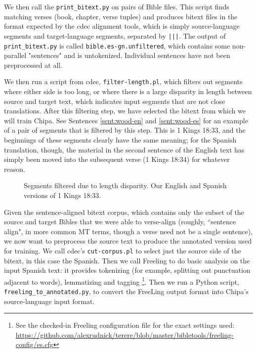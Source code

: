 We then call the \texttt{print\_bitext.py} on pairs of Bible files. This script
finds matching verses (book, chapter, verse tuples) and produces bitext files
in the format expected by the cdec alignment tools, which is simply
source-language segments and target-language segments, separated by
\texttt{|||}. The output of \texttt{print\_bitext.py} is called
\texttt{bible.es-gn.unfiltered}, which contains some non-parallel "sentences"
and is untokenized. Individual sentences have not been preprocessed at all.

We then run a script from cdec, \texttt{filter-length.pl}, which filters
out segments where either side is too long, or where there is a large disparity
in length between source and target text, which indicates input segments that
are not close translations. After this filtering step, we have selected the
bitext from which we will train Chipa. See Sentences \ref{sent:wood-en} and
\ref{sent:wood-es} for an example of a pair of segments that is filtered by
this step. This is 1 Kings 18:33, and the beginnings of these segments clearly
have the same meaning; for the Spanish translation, though, the material in the
second sentence of the English text has simply been moved into the subsequent
verse (1 Kings 18:34) for whatever reason.

\begin{figure}
\label{sent:wood-en}
\label{sent:wood-es}
  \caption{Segments filtered due to length disparity. Our English and Spanish
  versions of 1 Kings 18:33.}
  \label{fig:length-disparity}
\end{figure}

Given the sentence-aligned bitext corpus, which contains only the subset of the
source and target Bibles that we were able to verse-align (roughly, ``sentence
align", in more common MT terms, though a verse need not be a single sentence),
we now want to preprocess the source text to produce the annotated version used
for training. We call cdec's \texttt{cut-corpus.pl} to select just the source
side of the bitext, in this case the Spanish. Then we call Freeling to do basic
analysis on the input Spanish text: it provides tokenizing (for example,
splitting out punctuation adjacent to words), lemmatizing and tagging
\footnote{See the checked-in Freeling configuration file for the exact settings
used:
\url{https://github.com/alexrudnick/terere/blob/master/bibletools/freeling-config/es.cfg}}.
Then we run a Python script, \texttt{freeling\_to\_annotated.py}, to convert
the FreeLing output format into Chipa's source-language input format.

